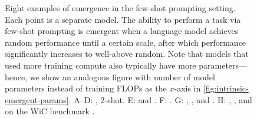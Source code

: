 \begin{figure}[ht]
\begin{centering}
    \caption{
    Eight examples of emergence in the few-shot prompting setting.
    Each point is a separate model.
    The ability to perform a task via few-shot prompting is emergent when a language model achieves random performance until a certain scale, after which performance significantly increases to well-above random.
    Note that models that used more training compute also typically have more parameters---hence, we show an analogous figure with number of model parameters instead of training FLOPs as the $x$-axis in \cref{fig:intrinsic-emergent-params}.
    A--D: \citet{bigbench}, 2-shot.
    E: \citet{lin2021truthfulqa} and \citet{rae2021scaling}. 
    F: \citet{patel2021mapping}.
    G: \citet{hendrycks2020measuring}, \citet{rae2021scaling}, and \citet{hoffmann2022training}.
    H: \citet{brown2020language}, \citet{hoffmann2022training}, and \citet{chowdhery2022palm} on the WiC benchmark \citep{pilehvar-camacho-collados-2019-wic}.
    } 
    \label{fig:intrinsic-emergent}
    \end{centering}
\end{figure}